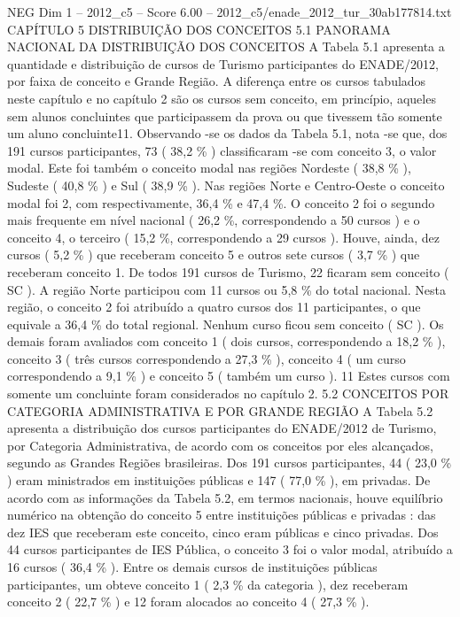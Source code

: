 \begin{textsample}{NEG Dim 1 – 2012\_c5 – Score 6.00 – 2012\_c5/enade\_2012\_tur\_30ab177814.txt}  \label{ex:f1_neg_328}
CAPÍTULO 5 DISTRIBUIÇÃO DOS CONCEITOS 5.1 PANORAMA NACIONAL DA DISTRIBUIÇÃO DOS CONCEITOS A Tabela 5.1 apresenta a quantidade e distribuição de cursos de Turismo participantes do ENADE/2012, por faixa de conceito e Grande Região.
A diferença entre os cursos tabulados neste capítulo e no capítulo 2 são os cursos sem conceito, em princípio, aqueles sem alunos concluintes que participassem da prova ou que tivessem tão somente um aluno concluinte11.
Observando -se os dados da Tabela 5.1, nota -se que, dos 191 cursos participantes, 73 ( 38,2 \% ) classificaram -se com conceito 3, o valor modal.
Este foi também o conceito modal nas regiões Nordeste ( 38,8 \% ), Sudeste ( 40,8 \% ) e Sul ( 38,9 \% ).
Nas regiões Norte e Centro-Oeste o conceito modal foi 2, com respectivamente, 36,4 \% e 47,4 \%.
O conceito 2 foi o segundo mais frequente em nível nacional ( 26,2 \%, correspondendo a 50 cursos ) e o conceito 4, o terceiro ( 15,2 \%, correspondendo a 29 cursos ).
Houve, ainda, dez cursos ( 5,2 \% ) que receberam conceito 5 e outros sete cursos ( 3,7 \% ) que receberam conceito 1.
De todos 191 cursos de Turismo, 22 ficaram sem conceito ( SC ).
A região Norte participou com 11 cursos ou 5,8 \% do total nacional.
Nesta região, o conceito 2 foi atribuído a quatro cursos dos 11 participantes, o que equivale a 36,4 \% do total regional.
Nenhum curso ficou sem conceito ( SC ).
Os demais foram avaliados com conceito 1 ( dois cursos, correspondendo a 18,2 \% ), conceito 3 ( três cursos correspondendo a 27,3 \% ), conceito 4 ( um curso correspondendo a 9,1 \% ) e conceito 5 ( também um curso ). 11 Estes cursos com somente um concluinte foram considerados no capítulo 2. 5.2 CONCEITOS POR CATEGORIA ADMINISTRATIVA E POR GRANDE REGIÃO A Tabela 5.2 apresenta a distribuição dos cursos participantes do ENADE/2012 de Turismo, por Categoria Administrativa, de acordo com os conceitos por eles alcançados, segundo as Grandes Regiões brasileiras.
Dos 191 cursos participantes, 44 ( 23,0 \% ) eram ministrados em instituições públicas e 147 ( 77,0 \% ), em privadas.
De acordo com as informações da Tabela 5.2, em termos nacionais, houve equilíbrio numérico na obtenção do conceito 5 entre instituições públicas e privadas : das dez IES que receberam este conceito, cinco eram públicas e cinco privadas.
Dos 44 cursos participantes de IES Pública, o conceito 3 foi o valor modal, atribuído a 16 cursos ( 36,4 \% ).
Entre os demais cursos de instituições públicas participantes, um obteve conceito 1 ( 2,3 \% da categoria ), dez receberam conceito 2 ( 22,7 \% ) e 12 foram alocados ao conceito 4 ( 27,3 \% ).

\end{textsample}
